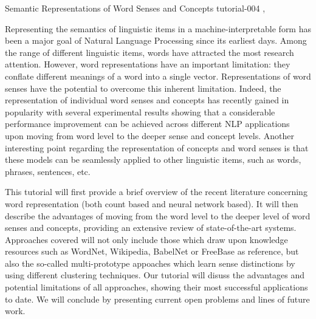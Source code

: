 \begin{tutorial}
  {Semantic Representations of Word Senses and Concepts}
    {tutorial-004}
      {\daydateyear, \tutorialmorningtime}
        {\TutLocD}
        
        Representing the semantics of linguistic items in a machine-interpretable form has been a major goal of Natural Language Processing since its earliest days. Among the range of different linguistic items, words have attracted the most research attention. However, word representations have an important limitation: they conflate different meanings of a word into a single vector. Representations of word senses have the potential to overcome this inherent limitation. Indeed, the representation of individual word senses and concepts has recently gained in popularity with several experimental results showing that a considerable performance improvement can be achieved across different NLP applications upon moving from word level to the deeper sense and concept levels. Another interesting point regarding the representation of concepts and word senses is that these models can be seamlessly applied to other linguistic items, such as words, phrases, sentences, etc.
        
        This tutorial will first provide a brief overview of the recent literature concerning word representation (both count based and neural network based). It will then describe the advantages of moving from the word level to the deeper level of word senses and concepts, providing an extensive review of state-of-the-art systems. Approaches covered will not only include those which draw upon knowledge resources such as WordNet, Wikipedia, BabelNet or FreeBase as reference, but also the so-called multi-prototype appoaches which learn sense distinctions by using different clustering techniques. Our tutorial will disuss the advantages and potential limitations of all approaches, showing their most successful applications to date. We will conclude by presenting current open problems and lines of future work.
        \end{tutorial}
        
